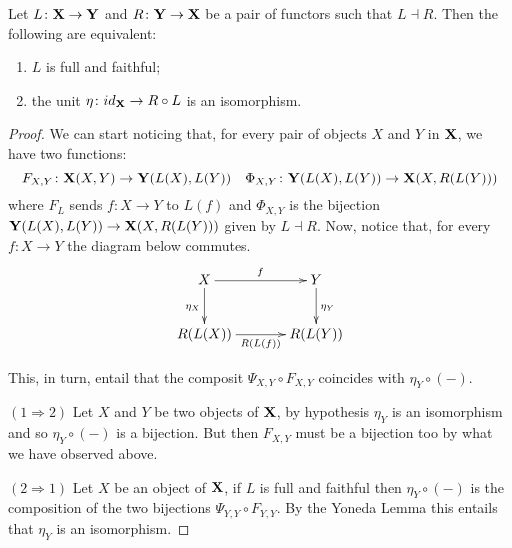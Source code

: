 \documentclass[a4paper,UKenglish,cleveref,pdftex,thm-restate,numberwithinsect]{lipics-v2021}
\newcommand{\id}[1]{\mathsf{id}_{#1}}
\def\R{\mathsf{R}}
\def\X{\textbf {\textup{X}}}
\def\Y{\textbf {\textup{Y}}}
\begin{document}
\begin{proposition}\label{prop:counit}
	Let $L\colon \X\to \Y$ and $R\colon \Y \to \X$ be a pair of functors such that $L\dashv R$. Then the following are equivalent:
	\begin{enumerate}
		\item $L$ is full and faithful;
		\item the unit $\eta \colon \id{\X}\to R\circ L$ is an isomorphism.
	\end{enumerate} 
\end{proposition}
\begin{proof}
	We can start noticing that, for every pair of objects $X$ and $Y$ in $\X$, we have two functions:
	\[F_{X, Y}\colon \X(X, Y)\to \Y(L(X), L(Y)) \quad 	 \Phi_{X, Y}\colon \Y(L(X), L(Y))\to \X(X, R(L(Y)))\]
	where $F_L$ sends $f\colon X\to Y$ to $L(f)$ and $\Phi_{X, Y}$ is the bijection $\Y(L(X), L(Y))\to \X(X, R(L(Y)))$ given by $L\dashv R$. Now, notice that, for every $f\colon X\to Y$ the diagram below commutes.
	\[\xymatrix@C=35pt{X \ar[r]^{f} \ar[d]_{\eta_X}& Y \ar[d]^{\eta_Y}\\R(L(X)) \ar[r]_-{R(L(f))} &R(L(Y)) }\]
	
	This, in turn, entail that the composit $\Psi_{X,Y} \circ F_{X, Y}$ coincides with $\eta_Y\circ (-)$.
	
	\smallskip \noindent 
	$(1\Rightarrow 2)$ Let $X$ and $Y$ be two objects of $\X$, by hypothesis $\eta_Y$ is an isomorphism and so $\eta_Y\circ (-)$ is a bijection. But then $F_{X, Y}$ must be a bijection too by what we have observed above.
	
	\smallskip \noindent 
	$(2\Rightarrow 1)$ Let $X$ be an object of $\X$, if $L$ is full and faithful then $\eta_Y\circ (-)$ is the composition of the two bijections $\Psi_{Y,Y}\circ F_{Y,Y}$. By the Yoneda Lemma this entails that $\eta_Y$ is an isomorphism.
\end{proof}
\end{document}
